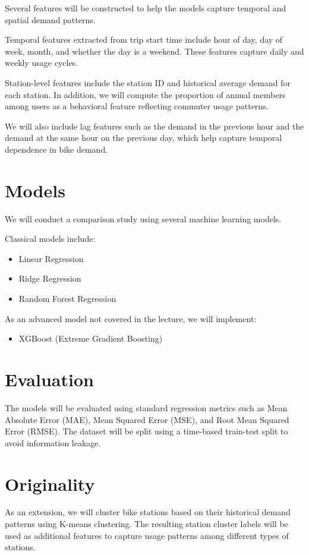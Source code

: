 \documentclass[11pt]{article}
\begin{document}
Several features will be constructed to help the models capture temporal and spatial
demand patterns.

Temporal features extracted from trip start time include hour of day, day of week,
month, and whether the day is a weekend. These features capture daily and weekly
usage cycles.

Station-level features include the station ID and historical average demand for
each station. In addition, we will compute the proportion of annual members among
users as a behavioral feature reflecting commuter usage patterns.

We will also include lag features such as the demand in the previous hour and the
demand at the same hour on the previous day, which help capture temporal dependence
in bike demand.

\section{Models}

We will conduct a comparison study using several machine learning models.

Classical models include:

\begin{itemize}
    \item Linear Regression
    \item Ridge Regression
    \item Random Forest Regression
\end{itemize}

As an advanced model not covered in the lecture, we will implement:

\begin{itemize}
    \item XGBoost (Extreme Gradient Boosting)
\end{itemize}

\section{Evaluation}

The models will be evaluated using standard regression metrics such as Mean Absolute
Error (MAE), Mean Squared Error (MSE), and Root Mean Squared Error (RMSE). The
dataset will be split using a time-based train-test split to avoid information leakage.

\section{Originality}

As an extension, we will cluster bike stations based on their historical demand
patterns using K-means clustering. The resulting station cluster labels will be
used as additional features to capture usage patterns among different types of
stations.
\end{document}
